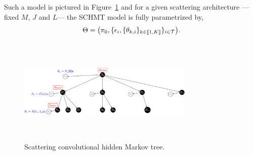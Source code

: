 \documentclass{article}
\begin{document}
    
    
    
    

    Such a model is pictured in Figure~\ref{fig:SCHMT 1} and for a given scattering architecture ---\ie fixed $M$, $J$ and $L$--- the SCHMT model is fully parametrized by,
    \vspace{-5pt}
    \begin{equation}
      \Theta = \big(\pi_{0}, \{ \epsilon_{i}, \{ \theta_{k,i} \}_{k\in\llbracket1,K\rrbracket} \}_{i\in\mathcal{T}}\big).
      \label{eq:SCHMT - parameters}
    \end{equation}
    \vspace{-15pt}

    \begin{figure}
      \begin{center}
        \includegraphics[width=3.3in, height=2in, keepaspectratio]{scat_HMT_crop.pdf}
        \caption{Scattering convolutional hidden Markov tree.}
        \label{fig:SCHMT 1}
      \end{center}
      \vspace{-15pt}
    \end{figure}
    
\end{document}
